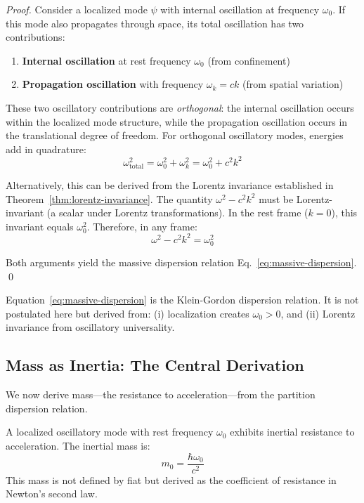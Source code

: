 \begin{proof}
Consider a localized mode $\psi$ with internal oscillation at frequency $\omega_0$. If this mode also propagates through space, its total oscillation has two contributions:
\begin{enumerate}
    \item \textbf{Internal oscillation} at rest frequency $\omega_0$ (from confinement)
    \item \textbf{Propagation oscillation} with frequency $\omega_k = ck$ (from spatial variation)
\end{enumerate}

These two oscillatory contributions are \textit{orthogonal}: the internal oscillation occurs within the localized mode structure, while the propagation oscillation occurs in the translational degree of freedom. For orthogonal oscillatory modes, energies add in quadrature:
\begin{equation}
    \omega_{\text{total}}^2 = \omega_0^2 + \omega_k^2 = \omega_0^2 + c^2 k^2
\end{equation}

Alternatively, this can be derived from the Lorentz invariance established in Theorem~\ref{thm:lorentz-invariance}. The quantity $\omega^2 - c^2k^2$ must be Lorentz-invariant (a scalar under Lorentz transformations). In the rest frame ($k = 0$), this invariant equals $\omega_0^2$. Therefore, in any frame:
\begin{equation}
    \omega^2 - c^2 k^2 = \omega_0^2
\end{equation}

Both arguments yield the massive dispersion relation Eq.~\eqref{eq:massive-dispersion}. \qed
\end{proof}

\begin{remark}
Equation~\eqref{eq:massive-dispersion} is the Klein-Gordon dispersion relation. It is not postulated here but derived from: (i) localization creates $\omega_0 > 0$, and (ii) Lorentz invariance from oscillatory universality.
\end{remark}

\subsection{Mass as Inertia: The Central Derivation}

We now derive mass---the resistance to acceleration---from the partition dispersion relation.

\begin{theorem}
\label{thm:inertia}
A localized oscillatory mode with rest frequency $\omega_0$ exhibits inertial resistance to acceleration. The inertial mass is:
\begin{equation}
    m_0 = \frac{\hbar \omega_0}{c^2}
    \label{eq:mass-definition}
\end{equation}
This mass is not defined by fiat but derived as the coefficient of resistance in Newton's second law.
\end{theorem}

